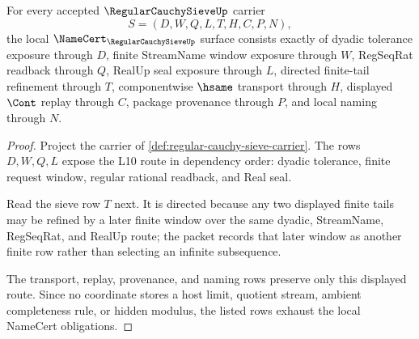 \begin{theorem}
\label{thm:regular-cauchy-sieve-namecert-obligations}
For every accepted $\RegularCauchySieveUp$ carrier
$$
S=(D,W,Q,L,T,H,C,P,N),
$$
the local $\NameCert_{\RegularCauchySieveUp}$ surface consists exactly of dyadic tolerance exposure through $D$, finite StreamName window exposure through $W$, RegSeqRat readback through $Q$, RealUp seal exposure through $L$, directed finite-tail refinement through $T$, componentwise $\hsame$ transport through $H$, displayed $\Cont$ replay through $C$, package provenance through $P$, and local naming through $N$.
\end{theorem}
\begin{proof}
Project the carrier of \autoref{def:regular-cauchy-sieve-carrier}. The rows $D,W,Q,L$ expose the L10 route in dependency order: dyadic tolerance, finite request window, regular rational readback, and Real seal.

Read the sieve row $T$ next. It is directed because any two displayed finite tails may be refined by a later finite window over the same dyadic, StreamName, RegSeqRat, and RealUp route; the packet records that later window as another finite row rather than selecting an infinite subsequence.

The transport, replay, provenance, and naming rows preserve only this displayed route. Since no coordinate stores a host limit, quotient stream, ambient completeness rule, or hidden modulus, the listed rows exhaust the local NameCert obligations.
\end{proof}

\begin{closurestatus}{\RegularCauchySieveUp}
  \theoryclosure{\seedClosure}
  \formalstatus{\unformalizedV}
\end{closurestatus}
